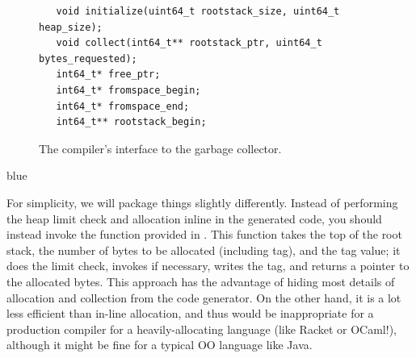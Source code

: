 \documentclass[11pt]{book}
\newenvironment{ocamlx}{
  \begin{color}{blue}
}
{
  \end{color}
}
\newtheorem{exercise}[theorem]{Exercise}
\begin{document}
\begin{figure}[tbp]
\begin{lstlisting}
   void initialize(uint64_t rootstack_size, uint64_t heap_size);
   void collect(int64_t** rootstack_ptr, uint64_t bytes_requested);
   int64_t* free_ptr;
   int64_t* fromspace_begin;
   int64_t* fromspace_end;
   int64_t** rootstack_begin;
\end{lstlisting}
\caption{The compiler's interface to the garbage collector.}
\label{fig:gc-header}
\end{figure}

\begin{ocamlx}
  For simplicity, we will package things slightly differently. Instead of
  performing the heap limit check and allocation inline in the generated
  code, you should instead invoke the  function provided in
  .  This function takes the top of the root stack,
  the number of bytes to be allocated (including tag), and the tag value; 
  it does the limit check, invokes 
  if necessary, writes the tag, and returns a pointer to the allocated bytes.
  This approach has the advantage of hiding most details of allocation and collection from the
  code generator. On the other hand, it is a lot less efficient than in-line
  allocation, and thus would be inappropriate for a production compiler for
  a heavily-allocating language (like Racket or OCaml!), although it might be
  fine for a typical OO language like Java.
\end{ocamlx}	

\end{document}
